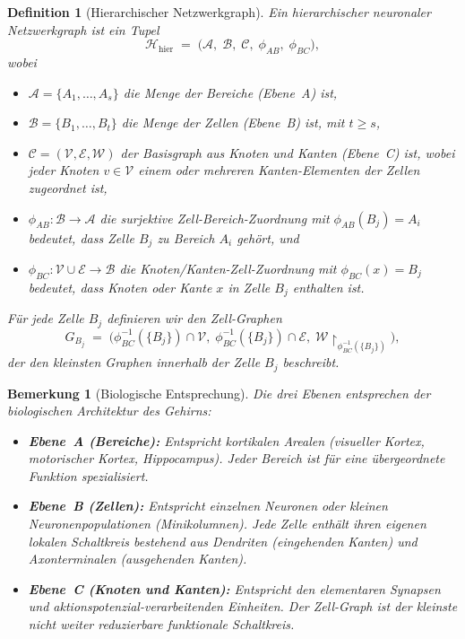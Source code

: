 \documentclass[12pt, a4paper, openany]{report}
\newtheorem{definition}[theorem]{Definition}
\newtheorem{remark}[theorem]{Bemerkung}
\newcommand{\calH}{\mathcal{H}}
\newcommand{\calV}{\mathcal{V}}
\newcommand{\calE}{\mathcal{E}}
\newcommand{\calW}{\mathcal{W}}
\newcommand{\calA}{\mathcal{A}}
\newcommand{\calB}{\mathcal{B}}
\newcommand{\calC}{\mathcal{C}}
\begin{document}
\begin{definition}[Hierarchischer Netzwerkgraph]
\label{def:hierarchical_graph}
Ein \emph{hierarchischer neuronaler Netzwerkgraph} ist ein Tupel
\[
  \calH_{\mathrm{hier}}
  \;=\;
  \bigl(\calA,\; \calB,\; \calC,\;
        \phi_{AB},\; \phi_{BC}\bigr),
\]
wobei
\begin{itemize}
  \item $\calA = \{A_1, \ldots, A_s\}$ die Menge der \emph{Bereiche}
    (Ebene~A) ist,
  \item $\calB = \{B_1, \ldots, B_t\}$ die Menge der \emph{Zellen}
    (Ebene~B) ist, mit $t \geq s$,
  \item $\calC = (\calV, \calE, \calW)$ der \emph{Basisgraph} aus Knoten
    und Kanten (Ebene~C) ist, wobei jeder Knoten $v \in \calV$ einem
    oder mehreren Kanten-Elementen der Zellen zugeordnet ist,
  \item $\phi_{AB} : \calB \to \calA$ die surjektive \emph{Zell-Bereich-Zuordnung}
    mit $\phi_{AB}(B_j) = A_i$ bedeutet, dass Zelle $B_j$ zu Bereich $A_i$
    gehört, und
  \item $\phi_{BC} : \calV \cup \calE \to \calB$ die \emph{Knoten/Kanten-Zell-Zuordnung}
    mit $\phi_{BC}(x) = B_j$ bedeutet, dass Knoten oder Kante $x$ in Zelle $B_j$
    enthalten ist.
\end{itemize}
Für jede Zelle $B_j$ definieren wir den \emph{Zell-Graphen}
\[
  G_{B_j}
  \;=\;
  \bigl(
    \phi_{BC}^{-1}(\{B_j\}) \cap \calV,\;
    \phi_{BC}^{-1}(\{B_j\}) \cap \calE,\;
    \calW\!\restriction_{\phi_{BC}^{-1}(\{B_j\})}
  \bigr),
\]
der den \emph{kleinsten Graphen} innerhalb der Zelle $B_j$ beschreibt.
\end{definition}

\begin{remark}[Biologische Entsprechung]
Die drei Ebenen entsprechen der biologischen Architektur des Gehirns:
\begin{itemize}
  \item \textbf{Ebene~A (Bereiche):} Entspricht kortikalen Arealen
    (visueller Kortex, motorischer Kortex, Hippocampus).  Jeder Bereich ist
    für eine übergeordnete Funktion spezialisiert.
  \item \textbf{Ebene~B (Zellen):} Entspricht einzelnen Neuronen oder kleinen
    Neuronenpopulationen (Minikolumnen).  Jede Zelle enthält ihren eigenen
    lokalen Schaltkreis bestehend aus Dendriten (eingehenden Kanten) und
    Axonterminalen (ausgehenden Kanten).
  \item \textbf{Ebene~C (Knoten und Kanten):} Entspricht den elementaren
    Synapsen und aktionspotenzial-verarbeitenden Einheiten.  Der Zell-Graph
    ist der kleinste nicht weiter reduzierbare funktionale Schaltkreis.
\end{itemize}
\end{remark}
\end{document}
